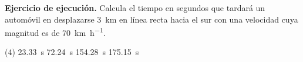 \documentclass[12pt, letter]{exam}
\begin{document}
\begin{questions}
    \question \label{Ejercicio_03} \textbf{Ejercicio de ejecución. } Calcula el tiempo en segundos que tardará un automóvil en desplazarse \SI{3}{\kilo\meter} en línea recta hacia el sur con una velocidad cuya magnitud es de \SI{70}{\kilo\meter\per\hour}.
    \begin{tasks}(4)
        \task \SI{23.33}{\second}
        \task \SI{72.24}{\second}
        \task \SI{154.28}{\second}
        \task \SI{175.15}{\second}
    \end{tasks}

\end{questions}
\end{document}

